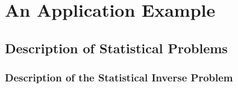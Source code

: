 \chapter{An Application Example}\label{ch-appl-example}
\thispagestyle{headings}



\clearpage
\section{Description of Statistical Problems}

\subsection{Description of the Statistical Inverse Problem}

